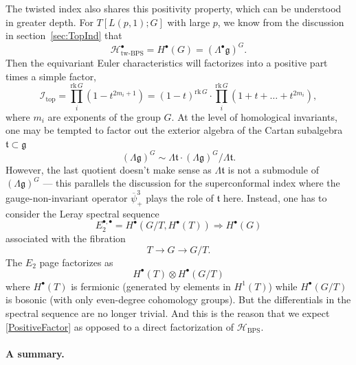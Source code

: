 \documentclass[hyper,letterpaper]{JHEP3}
\newcommand{\be}{\begin{equation}}
\newcommand{\ee}{\end{equation}}
\def\frak{\mathfrak}
\renewcommand{\bar}{\overline}
\def\CH{{\mathcal H}}
\def\CI{{\mathcal I}}
\begin{document}
The twisted index also shares this positivity property, which can be understood in greater depth. For $T[L(p,1);G]$ with large $p$, we know from the discussion in section~\ref{sec:TopInd} that
\be
\CH_\text{tw-BPS}^\bullet=H^\bullet(G)=(\Lambda^\bullet \frak{g})^G.
\ee
Then the equivariant Euler characteristics will factorizes into a positive part times a simple factor,
\be\label{TopIndPos}
\CI_{\text{top}}=\prod_i^{\mathrm{rk}\,G}(1-t^{2m_i+1})=(1-t)^{\mathrm{rk}\,G}\cdot \prod_i^{\mathrm{rk}\,G}(1+t+\ldots +t^{2m_i}),
\ee
where $m_i$ are exponents of the group $G$. At the level of homological invariants, one may be tempted to factor out the exterior algebra of the Cartan subalgebra $\frak{t}\subset\frak{g}$
\be
(\Lambda \frak{g})^G\sim\Lambda \frak{t} \cdot (\Lambda \frak{g})^G/\Lambda \frak{t}.
\ee
However, the last quotient doesn't make sense as $\Lambda \frak{t}$ is not a submodule of $(\Lambda \frak{g})^G$ --- this parallels the discussion for the superconformal index where the gauge-non-invariant operator $\bar{\psi}^3_+$ plays the role of $\frak{t}$ here. Instead, one has to consider the Leray spectral sequence
\be
E_2^{\bullet,\bullet}=H^{\bullet}(G/T,H^\bullet(T)) \Rightarrow H^\bullet(G)
\ee
associated with the fibration
\be
T\rightarrow G\rightarrow G/T.
\ee
The $E_2$ page factorizes as
\be
H^\bullet(T)\otimes H^{\bullet}(G/T)
\ee
where $H^\bullet(T)$ is fermionic (generated by elements in $H^1(T)$) while $H^{\bullet}(G/T)$ is bosonic (with only even-degree cohomology groups). But the differentials in the spectral sequence are no longer trivial. And this is the reason that we expect \eqref{PositiveFactor} as opposed to a direct factorization of $\CH_{\text{BPS}}$.

\paragraph{A summary.}
\end{document}
